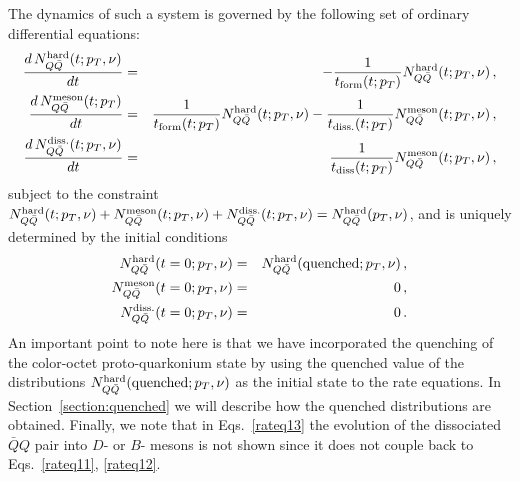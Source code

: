 \documentclass[article,showpacs,preprintnumbers,amsmath,amssymb]{revtex4}
\begin{document}
The dynamics of such a system is governed by the following set of ordinary 
differential equations:
\begin{eqnarray}
\label{rateq11}
\frac{d\,N^{\rm hard}_{Q\bar{Q}}(t;p_T,\nu)}{dt} 
&=& - \frac{1}{t_{\rm form}(t;p_T)} N^{\rm hard}_{Q\bar{Q}}(t;p_T,\nu) \, , \\
\frac{d\, N^{\rm meson}_{Q\bar{Q}}(t;p_T)}{dt} 
\label{rateq12}
&=&  \frac{1}{t_{\rm form}(t;p_T)} N^{\rm hard}_{Q\bar{Q}}(t;p_T,\nu) 
- \frac{1}{t_{\rm diss.}(t;p_T)} N^{\rm meson}_{Q\bar{Q}}(t;p_T,\nu) \, , \\
\frac{d\, N^{\rm diss.}_{Q\bar{Q}}(t;p_T,\nu)}{dt} 
&=&  \frac{1}{t_{\rm diss}(t;p_T)} N^{\rm meson}_{Q\bar{Q}}(t;p_T,\nu) \, , 
\label{rateq13}
\end{eqnarray}
subject to the constraint $N^{\rm hard}_{Q\bar{Q}}(t;p_T,\nu) + N^{\rm meson}_{Q\bar{Q}}(t;p_T,\nu) + 
N^{\rm diss.}_{Q\bar{Q}}(t;p_T,\nu) = N^{\rm hard}_{Q\bar{Q}}(p_T,\nu)$, and is uniquely 
determined by the initial conditions 
\begin{eqnarray}
\label{rateq1}
N^{\rm hard}_{Q\bar{Q}}(t=0;p_T,\nu) &=& N^{\rm hard}_{Q\bar{Q}}({\rm{quenched}};p_T,\nu)\,,\\ 
N^{\rm meson}_{Q\bar{Q}}(t=0;p_T,\nu) &=& 0 \,,\\ 
N^{\rm diss.}_{Q\bar{Q}}(t=0;p_T,\nu) &=& 0 \,. 
\end{eqnarray}
An important point to note here is that we have incorporated the quenching of
the color-octet proto-quarkonium state by using the quenched value of the
distributions $N^{\rm hard}_{Q\bar{Q}}({\rm{quenched}};p_T,\nu)$ as the initial
state to the rate equations. In Section~\ref{section:quenched} we will describe
how the quenched distributions are obtained.  Finally, we note that in
Eqs.~\ref{rateq13} the evolution of the dissociated  $\bar{Q}Q$ pair into
$D$- or $B$- mesons is not shown since it does not couple back to
Eqs.~\ref{rateq11}, \ref{rateq12}.
\end{document}
